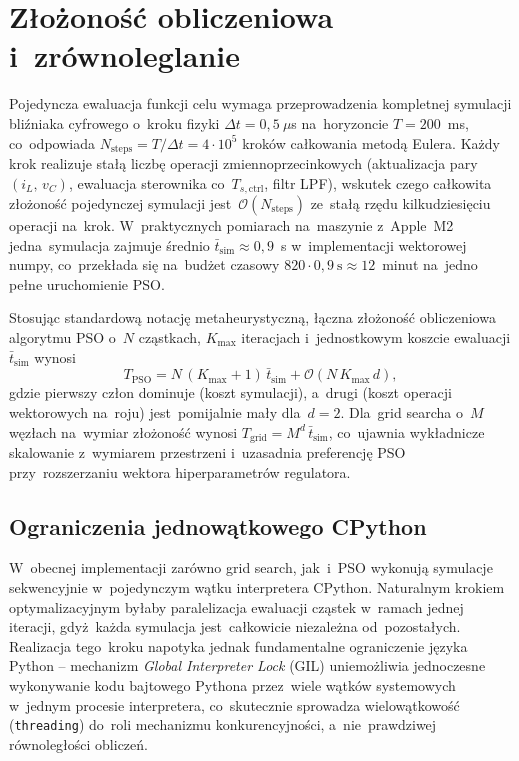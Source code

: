 \section{Złożoność obliczeniowa i~zrównoleglanie}
\label{sec:zlozonosc}

Pojedyncza ewaluacja funkcji celu wymaga przeprowadzenia kompletnej symulacji bliźniaka cyfrowego o~kroku fizyki $\Delta t = 0{,}5~\mu$s na~horyzoncie $T = 200$~ms, co~odpowiada $N_{\mathrm{steps}} = T/\Delta t = 4\cdot 10^{5}$ kroków całkowania metodą Eulera. Każdy krok realizuje stałą liczbę operacji zmiennoprzecinkowych (aktualizacja pary $(i_L,\,v_C)$, ewaluacja sterownika co~$T_{s,\mathrm{ctrl}}$, filtr LPF), wskutek czego całkowita złożoność pojedynczej symulacji jest~$\mathcal{O}(N_{\mathrm{steps}})$ ze~stałą rzędu kilkudziesięciu operacji na~krok. W~praktycznych pomiarach na~maszynie z~Apple~M2 jedna~symulacja zajmuje średnio $\bar t_{\mathrm{sim}} \approx 0{,}9$~s w~implementacji wektorowej numpy, co~przekłada się na~budżet czasowy $820 \cdot 0{,}9~\text{s} \approx 12$~minut na~jedno pełne uruchomienie PSO.

Stosując standardową notację metaheurystyczną, łączna złożoność obliczeniowa algorytmu PSO o~$N$ cząstkach, $K_{\max}$ iteracjach i~jednostkowym koszcie ewaluacji $\bar t_{\mathrm{sim}}$ wynosi
\begin{equation}
    T_{\mathrm{PSO}} = N\,(K_{\max}+1)\,\bar t_{\mathrm{sim}} + \mathcal{O}(N\,K_{\max}\,d),
    \label{eq:pso-complexity}
\end{equation}
gdzie pierwszy człon dominuje (koszt symulacji), a~drugi (koszt operacji wektorowych na~roju) jest~pomijalnie mały dla~$d = 2$. Dla~grid searcha o~$M$ węzłach na~wymiar złożoność wynosi $T_{\mathrm{grid}} = M^d\,\bar t_{\mathrm{sim}}$, co~ujawnia wykładnicze skalowanie z~wymiarem przestrzeni i~uzasadnia preferencję PSO przy~rozszerzaniu wektora hiperparametrów regulatora.

\subsection{Ograniczenia jednowątkowego CPython}

W~obecnej implementacji zarówno grid search, jak~i~PSO wykonują symulacje sekwencyjnie w~pojedynczym wątku interpretera CPython. Naturalnym krokiem optymalizacyjnym byłaby paralelizacja ewaluacji cząstek w~ramach jednej iteracji, gdyż~każda symulacja jest~całkowicie niezależna od~pozostałych. Realizacja tego~kroku napotyka jednak fundamentalne ograniczenie języka Python -- mechanizm \emph{Global Interpreter Lock} (GIL) uniemożliwia jednoczesne wykonywanie kodu bajtowego Pythona przez~wiele wątków systemowych w~jednym procesie interpretera, co~skutecznie sprowadza wielowątkowość (\texttt{threading}) do~roli mechanizmu konkurencyjności, a~nie~prawdziwej równoległości obliczeń.

